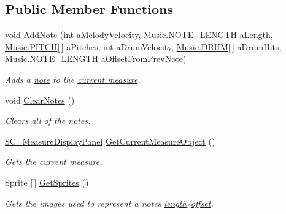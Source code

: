 \subsection*{Public Member Functions}
\begin{DoxyCompactItemize}
\item 
void \hyperlink{group___s_c___n_d_c_pub_func_ga43e58800daae0e46bbe1b86d78c2f677}{Add\+Note} (int a\+Melody\+Velocity, \hyperlink{group___music_enums_gaf11b5f079adbb21c800b9eca1c5c3cbd}{Music.\+N\+O\+T\+E\+\_\+\+L\+E\+N\+G\+TH} a\+Length, \hyperlink{group___music_enums_ga508f69b199ea518f935486c990edac1d}{Music.\+P\+I\+T\+CH}\mbox{[}$\,$\mbox{]} a\+Pitches, int a\+Drum\+Velocity, \hyperlink{group___music_enums_gade475b4382c7066d1af13e7c13c029b6}{Music.\+D\+R\+UM}\mbox{[}$\,$\mbox{]} a\+Drum\+Hits, \hyperlink{group___music_enums_gaf11b5f079adbb21c800b9eca1c5c3cbd}{Music.\+N\+O\+T\+E\+\_\+\+L\+E\+N\+G\+TH} a\+Offset\+From\+Prev\+Note)
\begin{DoxyCompactList}\small\item\em Adds a \hyperlink{group___music_structs_struct_music_1_1_combined_note}{note} to the \hyperlink{group___doc_s_c___m_d_p}{current measure}. \end{DoxyCompactList}\item 
void \hyperlink{group___s_c___n_d_c_pub_func_gaa344983500e83531210ae1c4789182f3}{Clear\+Notes} ()
\begin{DoxyCompactList}\small\item\em Clears all of the notes. \end{DoxyCompactList}\item 
\hyperlink{class_s_c___measure_display_panel}{S\+C\+\_\+\+Measure\+Display\+Panel} \hyperlink{group___s_c___n_d_c_pub_func_ga526a610a4462b164cc91ae7155803ba1}{Get\+Current\+Measure\+Object} ()
\begin{DoxyCompactList}\small\item\em Gets the current \hyperlink{group___doc_s_c___m_d_p}{measure}. \end{DoxyCompactList}\item 
Sprite \mbox{[}$\,$\mbox{]} \hyperlink{group___s_c___n_d_c_pub_func_ga3cdbb1068cd6511112c564fc636c56ca}{Get\+Sprites} ()
\begin{DoxyCompactList}\small\item\em Gets the images used to represent a note\textquotesingle{}s \hyperlink{group___music_structs_ac35cd02f5b3c00e3040b51e40e9e6c94}{length}/\hyperlink{group___music_structs_ae281187907aed4c728c7981300dbebaf}{offset}. \end{DoxyCompactList}\item 

\end{DoxyCompactItemize}
